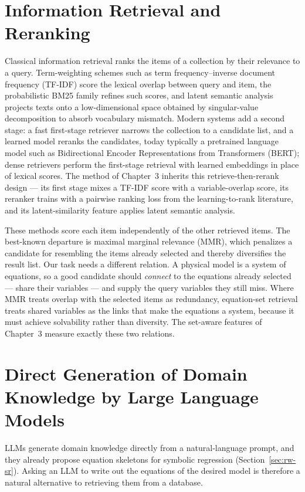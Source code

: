\section{Information Retrieval and Reranking}
\label{sec:rw-ir}

Classical information retrieval ranks the items of a collection by their relevance to a
query\cite{Manning}. Term-weighting schemes such as term frequency--inverse document frequency
(TF-IDF) score the lexical overlap between query and item\cite{Salton}, the probabilistic BM25
family refines such scores\cite{BM25}, and latent semantic analysis projects texts onto a
low-dimensional space obtained by singular-value decomposition to absorb vocabulary
mismatch\cite{LSA}. Modern systems add a second stage: a fast first-stage retriever narrows the
collection to a candidate list, and a learned model reranks the candidates, today typically a
pretrained language model such as Bidirectional Encoder Representations from Transformers
(BERT)\cite{BERT,BERTrerank}; dense retrievers perform the first-stage retrieval with learned
embeddings in place of lexical scores\cite{DPR}. The method of Chapter~3 inherits this
retrieve-then-rerank design --- its first stage mixes a TF-IDF score with a variable-overlap score,
its reranker trains with a pairwise ranking loss from the learning-to-rank literature\cite{LTR},
and its latent-similarity feature applies latent semantic analysis.

These methods score each item independently of the other retrieved items. The best-known departure
is maximal marginal relevance (MMR), which penalizes a candidate for resembling the items already
selected and thereby diversifies the result list\cite{MMR}. Our task needs a different relation.
A physical model is a system of equations, so a good candidate should \emph{connect} to the
equations already selected --- share their variables --- and supply the query variables they still
miss. Where MMR treats overlap with the selected items as redundancy, equation-set retrieval treats
shared variables as the links that make the equations a system, because it must achieve
solvability rather than diversity. The set-aware features of Chapter~3 measure exactly these two
relations.

\section{Direct Generation of Domain Knowledge by Large Language Models}
\label{sec:rw-llm}

LLMs generate domain knowledge directly from a natural-language prompt\cite{GPT3}, and they already
propose equation skeletons for symbolic regression (Section~\ref{sec:rw-sr}). Asking an LLM to
write out the equations of the desired model is therefore a natural alternative to retrieving them
from a database.

